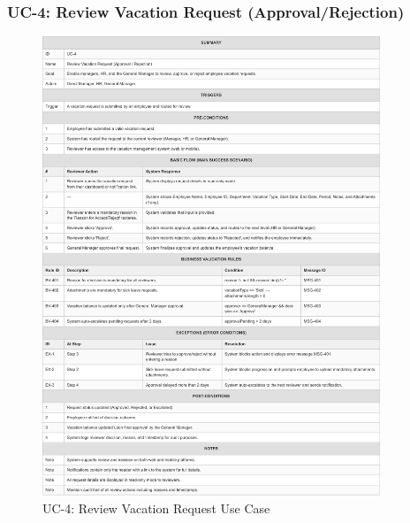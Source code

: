 \documentclass[12pt,a4paper]{article}
\begin{document}
\subsubsection{UC-4: Review Vacation Request (Approval/Rejection)}
\begin{figure}[H]
\centering
\includegraphics[width=0.9\textwidth]{Use-Cases/UC-4-Review-Vacation-Request/UC-4-Review-Vacation-Request-1.png}
\caption{UC-4: Review Vacation Request Use Case}
\label{fig:uc4}
\end{figure}
\end{document}
